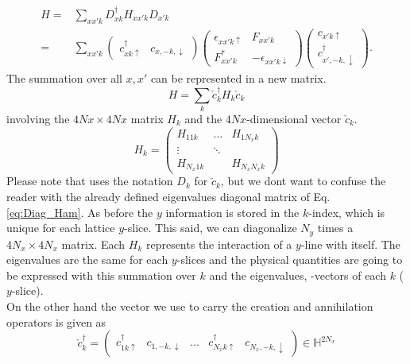 \documentclass[../main.tex]{subfile}
\begin{document}
\begin{equation}
    \begin{aligned}
    H =& \sum_{xx'k} D_{xk}^{\dagger} H_{xx'k} D_{x'k}\\
      =& \sum_{xx'k} \begin{pmatrix}
        c^{\dagger}_{xk\uparrow} & c_{x,-k,\downarrow}
      \end{pmatrix}
        \begin{pmatrix}
            \epsilon_{xx'k\uparrow} & F_{xx'k}\\
            F_{xx'k}^{\ast} & -\epsilon_{xx'k\downarrow}
        \end{pmatrix}
        \begin{pmatrix}
            c_{x'k\uparrow}\\
            c^{\dagger}_{x',-k,\downarrow}
        \end{pmatrix}.
    \end{aligned}
\end{equation}
The summation over all $x,x'$ can be represented in a new matrix.
\[
    H = \sum_k \check{c}_k^{\dagger} H_k \check{c}_k
\]
involving the $4Nx \times 4Nx$ matrix $H_k$ and the $4Nx$-dimensional vector $\check{c}_k$. 
\[
    H_k = \begin{pmatrix}
        H_{11k} &\dots & H_{1N_xk}\\
        \vdots&\ddots&\\
        H_{N_x1k} & & H_{N_xN_xk}
    \end{pmatrix}
\]
Please note that \cite{Mjos2019} uses the notation $D_k$ for $\check{c}_k$, but we dont want to confuse the reader with the already defined eigenvalues
 diagonal matrix of Eq.\ref{eq:Diag_Ham}.
As before the $y$ information is stored in the $k$-index, which is unique for each lattice $y$-slice. This said, we 
can diagonalize $N_y$ times a $4N_x \times 4N_x$ matrix. Each $H_k$ represents the interaction of a $y$-line with itself.
The eigenvalues are the same for each $y$-slices and the physical
quantities are going to be expressed with this summation over $k$ and the eigenvalues, -vectors of each $k$ ($y$-slice).\\

On the other hand the vector we use to carry the creation and annihilation operators is given as 
\[
    \check{c}_k^{\dagger} = \begin{pmatrix}
        c^{\dagger}_{1k\uparrow} & c_{1,-k,\downarrow}& \dots &c^{\dagger}_{N_x k\uparrow} & c_{N_x,-k,\downarrow}
    \end{pmatrix}\in\mathbb{H}^{2N_x}
\]
\end{document}
